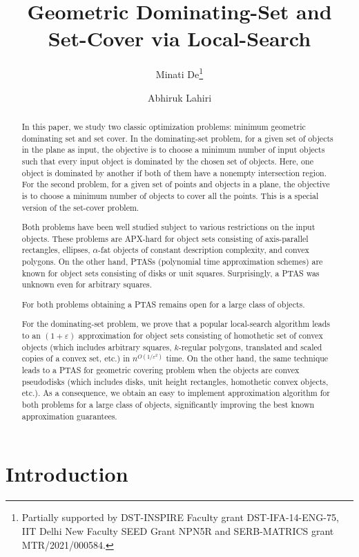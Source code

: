 \documentclass[a4paper,11pt]{article}
\title{Geometric  Dominating-Set and Set-Cover via Local-Search}
\author[1]{Minati De\footnote{Partially supported by DST-INSPIRE Faculty grant DST-IFA-14-ENG-75,   IIT Delhi New Faculty SEED Grant  NPN5R and SERB-MATRICS grant MTR/2021/000584.}}
\affil{Deptartment of Mathematics\\ Indian Institute of  
Technology Delhi, India\\
\texttt{minati@maths.iitd.ac.in}
}
\author[2]{Abhiruk Lahiri}
\affil{Department of Computer Science and Automation\\ Indian Institute of Science, Bangalore, India\\
\texttt{abhiruk@iisc.ac.in}
}
\date{}
\begin{document}
\maketitle
\begin{abstract}
In this paper, we study two classic optimization  problems: minimum geometric dominating 
set and set 
cover. In the dominating-set problem, for  a given set of objects in {the} plane as input, the 
objective is to choose a  minimum number of input objects such 
that every input object is dominated by the chosen set of objects. Here, one 
object is dominated by  {another} if both of them have {a} nonempty intersection 
region. 
For the second problem, for a given  set of points and  
objects {in a plane}, the objective is to choose {a} minimum number of objects
 to cover all the points. This is a special version of the set-cover problem. 

{Both problems have been well studied subject to various restrictions on the input objects.}
These problems {are} 
APX-hard {for object sets} consisting of axis-parallel rectangles, ellipses, $\alpha$-fat 
objects 
of constant description complexity, and convex polygons. On the other hand, 
PTASs (polynomial time approximation schemes) are known  {for object sets} consisting of disks or unit squares. 
Surprisingly, {a} PTAS was unknown even 
for arbitrary squares. 

 For both  problems 
obtaining a PTAS remains open for a large class of objects. 

For the dominating-set problem, we prove that {a} popular local-search 
algorithm leads to an  $(1+\varepsilon)$ approximation for object sets consisting of homothetic set of convex objects (which includes   arbitrary squares, $k$-regular polygons, translated and scaled copies of a convex set, etc.) in $n^{O(1/\varepsilon^2)}$ time. 
On the other 
hand, the same technique leads to a PTAS  for geometric covering problem when 
the 
objects are  convex pseudodisks (which includes disks, unit height rectangles, homothetic convex objects, etc.). 
As a consequence, we obtain an  easy to implement approximation algorithm for both problems for a large class of objects,  significantly improving the best 
known approximation guarantees. 

\end{abstract}

\section{Introduction}
\end{document}

